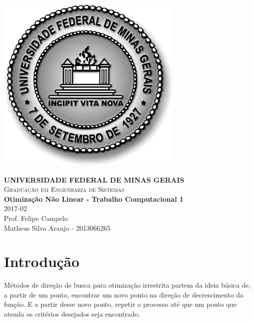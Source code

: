 \documentclass[10pt,a4paper]{article}
\begin{document}

	\begin{minipage}[b]{0.05\linewidth}
			\includegraphics[scale=0.3]{ufmg}
	\end{minipage}
	\hfill
	\begin{minipage}[b]{0.95\linewidth}
		\begin{flushright}
			\textbf{UNIVERSIDADE FEDERAL DE MINAS GERAIS} \\
			\textsc{Graduação em Engenharia de Sistemas} \\
			\textbf{Otimização Não Linear - Trabalho Computacional 1} \\
			2017-02 \\
			Prof. Felipe Campelo \\
			Matheus Silva Araujo - 2013066265
		\end{flushright}
	\end{minipage}

	\begin{center}
		\hrulefill
	\end{center}


	\section{Introdução}

	Métodos de direção de busca para otimização irrestrita partem da ideia básica de, a partir de um ponto, 
	encontrar um novo ponto na direção de decrescimento da função. E a partir desse novo ponto, repetir o processo
	até que um ponto que atenda os critérios desejados seja encontrado.
\end{document}
